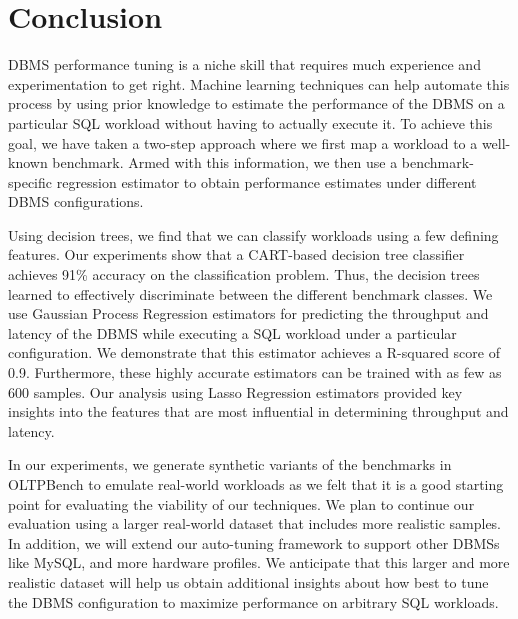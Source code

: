 \section{Conclusion} \label{sec:conclusion}

DBMS performance tuning is a niche skill that requires much experience
and experimentation to get right. Machine learning techniques can help 
automate this process by using prior knowledge to estimate the 
performance of the DBMS on a particular SQL workload 
without having to actually execute it. 
To achieve this goal, we have taken a two-step approach where 
we first map a workload to a well-known benchmark. 
Armed with this information, we then use a benchmark-specific
regression estimator to obtain performance estimates 
under different DBMS configurations.

Using decision trees, we find that we can classify workloads 
using a few defining features.  
Our experiments show that a CART-based decision tree classifier
achieves 91\% accuracy on the classification problem.
Thus, the decision trees learned to effectively discriminate 
between the different benchmark classes.
We use Gaussian Process Regression estimators for predicting 
the throughput and latency of the DBMS while executing a
SQL workload under a particular configuration.
We demonstrate that this estimator achieves a R-squared score 
of 0.9. 
Furthermore, these highly accurate estimators can be trained 
with as few as 600 samples. 
Our analysis using Lasso Regression estimators provided key 
insights into the features that are most influential in 
determining throughput and latency.

In our experiments, we generate synthetic variants of the
benchmarks in OLTPBench to emulate real-world workloads as
we felt that it is a good starting point for evaluating the
viability of our techniques.
We plan to continue our evaluation using a larger real-world
dataset that includes more realistic samples. 
In addition, we will extend our auto-tuning framework to 
support other DBMSs like MySQL, and more hardware profiles. 
We anticipate that this larger and more realistic dataset 
will help us obtain additional insights about how best to 
tune the DBMS configuration to maximize performance on 
arbitrary SQL workloads.
